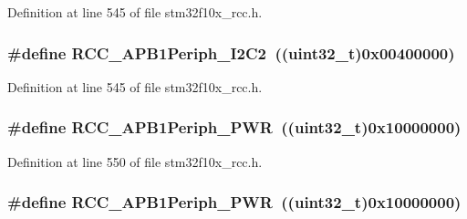 Definition at line 545 of file stm32f10x\+\_\+rcc.\+h.

\subsubsection[{\texorpdfstring{R\+C\+C\+\_\+\+A\+P\+B1\+Periph\+\_\+\+I2\+C2}{RCC_APB1Periph_I2C2}}]{\setlength{\rightskip}{0pt plus 5cm}\#define R\+C\+C\+\_\+\+A\+P\+B1\+Periph\+\_\+\+I2\+C2~(({\bf uint32\+\_\+t})0x00400000)}\hypertarget{group___a_p_b1__peripheral_ga8eaeded403b5a2277fbfb3896c639416}{}\label{group___a_p_b1__peripheral_ga8eaeded403b5a2277fbfb3896c639416}


Definition at line 545 of file stm32f10x\+\_\+rcc.\+h.

\subsubsection[{\texorpdfstring{R\+C\+C\+\_\+\+A\+P\+B1\+Periph\+\_\+\+P\+WR}{RCC_APB1Periph_PWR}}]{\setlength{\rightskip}{0pt plus 5cm}\#define R\+C\+C\+\_\+\+A\+P\+B1\+Periph\+\_\+\+P\+WR~(({\bf uint32\+\_\+t})0x10000000)}\hypertarget{group___a_p_b1__peripheral_ga59ae4e17d5b35a934b1614f8ee883834}{}\label{group___a_p_b1__peripheral_ga59ae4e17d5b35a934b1614f8ee883834}


Definition at line 550 of file stm32f10x\+\_\+rcc.\+h.

\subsubsection[{\texorpdfstring{R\+C\+C\+\_\+\+A\+P\+B1\+Periph\+\_\+\+P\+WR}{RCC_APB1Periph_PWR}}]{\setlength{\rightskip}{0pt plus 5cm}\#define R\+C\+C\+\_\+\+A\+P\+B1\+Periph\+\_\+\+P\+WR~(({\bf uint32\+\_\+t})0x10000000)}\hypertarget{group___a_p_b1__peripheral_ga59ae4e17d5b35a934b1614f8ee883834}{}\label{group___a_p_b1__peripheral_ga59ae4e17d5b35a934b1614f8ee883834}


